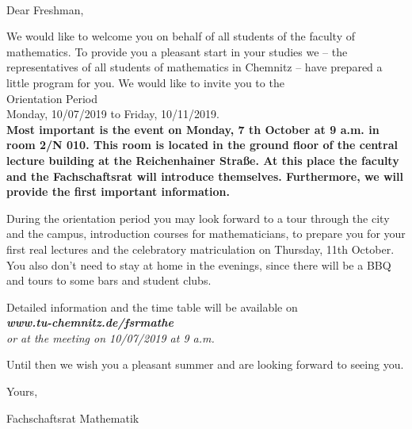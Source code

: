 \documentclass[nkz,einrichtung,usemycontact]{tucletter2019}
\begin{document}
	
\begin{letter}{%
\, \\
}

\opening{Dear Freshman,}

We would like to welcome you on behalf of all students of the faculty of mathematics. To provide you a pleasant start in your studies we – the representatives of all students of mathematics in Chemnitz – have prepared a little program for you. We would like to invite you to the\\[12pt]

\hspace*{\fill} \Large Orientation Period \hspace*{\fill} \\
\hspace*{\fill} Monday, 10/07/2019 to Friday, 10/11/2019. \normalsize \hspace*{\fill} \\[16pt]

\bfseries Most important is the event on Monday, 7 th October at 9 a.m. in room
2/N 010. This room is located in the ground floor of the central lecture building
at the Reichenhainer Straße. At this place the faculty and the Fachschaftsrat
will introduce themselves. Furthermore, we will provide the first important
information.\mdseries

\medskip

During the orientation period you may look forward to a tour through the city and the
campus, introduction courses for mathematicians, to prepare you for your first real lectures and the celebratory matriculation on Thursday, 11th October. You also don’t need to stay at home in the evenings, since there will be a BBQ and tours to some bars and student clubs.

\medskip

Detailed information and the time table will be available on\\[8pt]
\hspace*{\fill} \itshape\textbf{www.tu-chemnitz.de/fsrmathe} \upshape \hspace*{\fill} \\[8pt]
or at the meeting on 10/07/2019 at 9 a.m.

\medskip

Until then we wish you a pleasant summer and are looking forward to seeing you.

\medskip

Yours,

Fachschaftsrat Mathematik

\end{letter}
\end{document}
